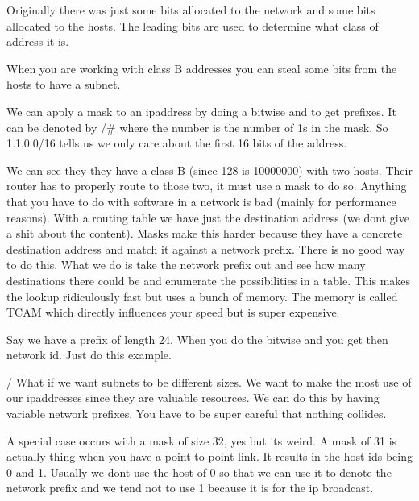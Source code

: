 \documentclass[12pt]{article}
\begin{document}

Originally there was just some bits allocated to the network and some bits allocated to the hosts. The leading bits are used to determine what class of address it is. 


When you are working with class B addresses you can steal some bits from the hosts to have a subnet.


We can apply a mask to an ipaddress by doing a bitwise and to get prefixes. It can be denoted by /# where the number is the number of 1s in the mask. So 1.1.0.0/16 tells us we only care about the first 16 bits of the address.


We can see they they have a class B (since 128 is 10000000) with two hosts. Their router has to properly route to those two, it must use a mask to do so. Anything that you have to do with software in a network is bad (mainly for performance reasons). With a routing table we have just the destination address (we dont give a shit about the content). Masks make this harder because they have a concrete destination address and match it against a network prefix. There is no good way to do this. What we do is take the network prefix out and see how many destinations there could be and enumerate the possibilities in a table. This makes the lookup ridiculously fast but uses a bunch of memory. The memory is called TCAM which directly influences your speed but is super expensive. 


Say we have a prefix of length 24. When you do the bitwise and you get then network id. Just do this example. 

/
What if we want subnets to be different sizes. We want to make the most use of our ipaddresses since they are valuable resources. We can do this by having variable network prefixes. You have to be super careful that nothing collides. 


A special case occurs with a mask of size 32, yes but its weird. A mask of 31 is actually thing when you have a point to point link. It results in the host ids being 0 and 1. Usually we dont use the host of 0 so that we can use it to denote the network prefix and we tend not to use 1 because it is for the ip broadcast.
\end{document}
